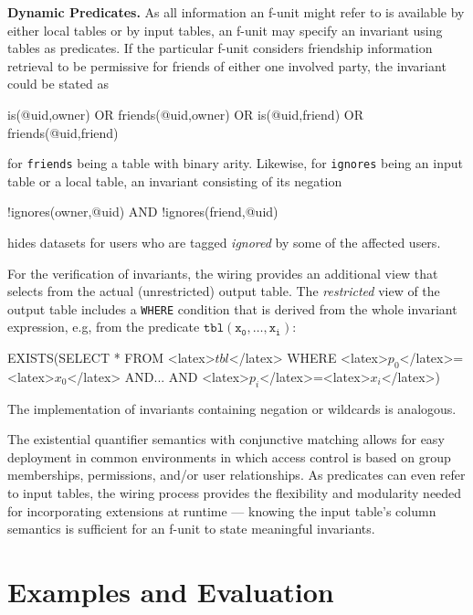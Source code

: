 \documentclass{src/acm_proc_article-sp} \else
\newcommand\myparagraph[1]{\medskip\noindent\textbf{#1.}}
\begin{document}
\myparagraph{Dynamic Predicates} As all information an f-unit might refer to is available by either local tables or by input tables, an f-unit may specify an invariant using tables as predicates. If the particular f-unit considers friendship information retrieval to be permissive for  friends of either one involved party, the invariant could be stated as
\begin{lsthere}
   is(@uid,owner) OR friends(@uid,owner) OR is(@uid,friend) OR friends(@uid,friend)
\end{lsthere}
for \texttt{friends} being a table with binary arity. Likewise, for \texttt{ignores} being an input table or a local table, an invariant consisting of its negation
\begin{lsthere}
   !ignores(owner,@uid) AND !ignores(friend,@uid)
\end{lsthere}
hides datasets for users who are tagged \emph{ignored} by some of the affected users.

For the verification of invariants, the wiring provides an additional
view that selects from the actual (unrestricted) output table.
The \emph{restricted} view of the output table includes a
\texttt{WHERE} condition that is derived from the whole invariant
expression, e.g, from the predicate $\mathtt{tbl(x_0, \ldots, x_i)}$:
\begin{lsthere}
   EXISTS(SELECT * FROM <latex>$\mathit{tbl}$</latex> WHERE <latex>$p_0$</latex>=<latex>$x_0$</latex> AND... AND <latex>$p_i$</latex>=<latex>$x_i$</latex>)
\end{lsthere}
The implementation of invariants containing negation or wildcards is
analogous.



The existential quantifier semantics with conjunctive matching allows
for easy deployment in common environments in which access control is
based on group memberships, permissions, and/or user relationships.
As predicates can even refer to input tables, the wiring process
provides the flexibility and modularity needed for incorporating
extensions at runtime --- knowing the input table's column semantics
is sufficient for an f-unit to state meaningful invariants.





   \section{Examples and Evaluation}
\label{sec:evaluation}
\end{document}
